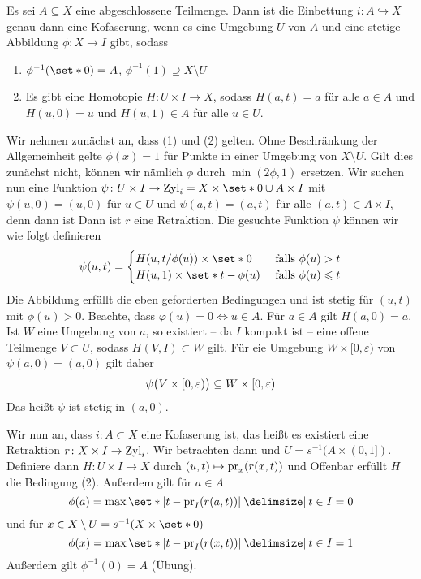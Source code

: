 \begin{satz}[{name={Charakterisierung von Kofaserungen}}]
	Es sei $A \subseteq X$  eine abgeschlossene Teilmenge.
	Dann ist die Einbettung $i \colon A \hookrightarrow X$ genau dann eine Kofaserung, wenn es eine Umgebung $U$ von $A$ und eine stetige Abbildung $\phi \colon X \to I$ gibt, sodass 
	\begin{enumerate}[(1)]
		\item $\phi^{-1}(\set*{0}) = A$, $\phi^{-1}(1) \supseteq X \setminus U$
		\item Es gibt eine Homotopie $H \colon U \times I \to X$, sodass $H(a,t)=a$ für alle $a \in A$ und $H(u,0)=u$ und $H(u,1) \in A$ für alle $u \in U$.
	\end{enumerate}
\end{satz}
\begin{beweis}
	Wir nehmen zunächst an, dass (1) und (2) gelten.
	Ohne Beschränkung der Allgemeinheit gelte $\phi(x)=1$ für Punkte in einer Umgebung von $X \setminus U$.
	Gilt dies zunächst nicht, können wir nämlich $\phi$ durch $\min(2 \phi,1)$ ersetzen.
	Wir suchen nun eine Funktion $\psi \colon U \times I \to \Zyl_i = X \times \set*{0} \cup A \times I$ mit $\psi(u,0)=(u,0)$ für $u \in U$ und $\psi(a,t)=(a,t)$ für alle $(a,t) \in A \times I$, denn dann ist
	Dann ist $r$ eine Retraktion.
	Die gesuchte Funktion $\psi$ können wir wie folgt definieren
	\[
		\psi(u,t) = \begin{cases}
			H(u,t/\phi(u)) \times \set*{0} &\text{ falls }\phi(u)>t\\
			H(u,1) \times \set*{t- \phi(u)} &\text{ falls } \phi(u)\le t
		\end{cases}
	\]
	Die Abbildung erfüllt die eben geforderten Bedingungen und ist stetig für $(u,t)$ mit $\phi(u)>0$.
	Beachte, dass $\varphi(u)=0 \iff u \in A$.
	Für $a \in A$ gilt $H(a,0)=a$.
	Ist $W$ eine Umgebung von $a$, so existiert -- da $I$ kompakt ist -- eine offene Teilmenge $V \subset U$, sodass $H(V,I) \subset W$ gilt.
	Für eie Umgebung $W \times [0,\varepsilon)$ von $\psi(a,0)=(a,0)$ gilt daher
	\[
		\psi \enbrace[\big]{V\times [0,\varepsilon)} \subseteq W \times [0,\varepsilon)
	\]
	Das heißt $\psi$ ist stetig in $(a,0)$.
	
	Wir nun an, dass $i \colon A \subset X$ eine Kofaserung ist, das heißt es existiert eine Retraktion $r \colon  X\times I \to \Zyl_i$.
	Wir betrachten dann
	und $U = s^{-1}(A \times (0,1])$.
	Definiere dann $H \colon U \times I \to X$ durch $(u,t) \mapsto \pr_x(r(x,t))$ und
	Offenbar erfüllt $H$ die Bedingung (2).
	Außerdem gilt für $a \in A$
	\[
		\phi(a) = \max \set*{\abs*{t - \pr_I(r(a,t))} \given t \in I} =0
	\]
	und für $x \in X\setminus U = s^{-1}(X \times \set*{0})$
	\[
		\phi(x) = \max \set*{\abs*{t- \pr_I \enbrace*{r(x,t)}} \given t \in I} = 1
	\]
	Außerdem gilt $\phi^{-1}(0)=A$ (Übung).
\end{beweis}

